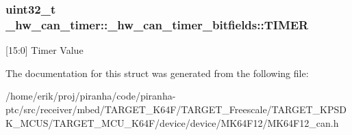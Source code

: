 \subsubsection[{\texorpdfstring{T\+I\+M\+ER}{TIMER}}]{\setlength{\rightskip}{0pt plus 5cm}uint32\+\_\+t \+\_\+hw\+\_\+can\+\_\+timer\+::\+\_\+hw\+\_\+can\+\_\+timer\+\_\+bitfields\+::\+T\+I\+M\+ER}\hypertarget{struct__hw__can__timer_1_1__hw__can__timer__bitfields_a5086764c340db5d19202d19b8c521f28}{}\label{struct__hw__can__timer_1_1__hw__can__timer__bitfields_a5086764c340db5d19202d19b8c521f28}
\mbox{[}15\+:0\mbox{]} Timer Value 

The documentation for this struct was generated from the following file\+:\begin{DoxyCompactItemize}
\item 
/home/erik/proj/piranha/code/piranha-\/ptc/src/receiver/mbed/\+T\+A\+R\+G\+E\+T\+\_\+\+K64\+F/\+T\+A\+R\+G\+E\+T\+\_\+\+Freescale/\+T\+A\+R\+G\+E\+T\+\_\+\+K\+P\+S\+D\+K\+\_\+\+M\+C\+U\+S/\+T\+A\+R\+G\+E\+T\+\_\+\+M\+C\+U\+\_\+\+K64\+F/device/device/\+M\+K64\+F12/M\+K64\+F12\+\_\+can.\+h\end{DoxyCompactItemize}
